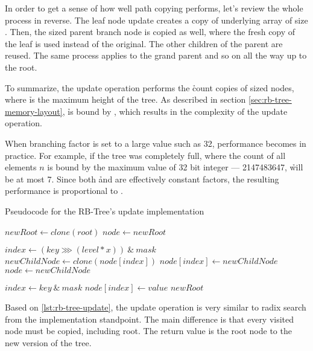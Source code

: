 In order to get a sense of how well path copying performs, let’s review the whole process in reverse. The leaf node update creates a copy of underlying array of size \m. Then, the \m sized parent branch node is copied as well, where the fresh copy of the leaf is used instead of the original. The other children of the parent are reused. The same process applies to the grand parent and so on all the way up to the root. 

To summarize, the update operation performs the \h count copies of \m sized nodes, where \h is the maximum height of the tree. As described in section \ref{sec:rb-tree-memory-layout}, \h is bound by , which results in the {} complexity of the update operation. 

When branching factor \m is set to a large value such as 32, performance becomes  in practice. For example, if the tree was completely full, where the count of all elements $n$ is bound by the maximum value of 32 bit integer —  2147483647, \h will be at most 7. Since both \h and \m are effectively constant factors, the resulting performance is proportional to . 

\begin{listing}[ht!]    
    \label{lst:rb-tree-update}
    \caption{Pseudocode for the RB-Tree's update implementation}
    
    \begin{algorithmic}
            \State $newRoot \leftarrow clone(root)$
            \State $node \leftarrow newRoot$
    
                \State $index \leftarrow (key \ggg (level * x))\ \&\ mask$
                \State $newChildNode \leftarrow clone(node[index])$
                \State $node[index] \leftarrow newChildNode$
                \State $node \leftarrow newChildNode$
            \EndFor
    
            \State $index \leftarrow key\ \&\ mask$
            \State $node[index] \leftarrow value$            
            \State \Return $newRoot$
        \EndFunction
    \end{algorithmic}
\end{listing}

Based on \ref{lst:rb-tree-update}, the update operation is very similar to radix search from the implementation standpoint. The main difference is that every visited node must be copied, including root. The return value is the root node to the new version of the tree. 

